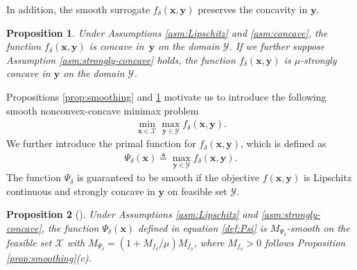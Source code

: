\documentclass[11pt]{article}
\def\vx{\mathbf{x}}
\def\vy{\mathbf{y}}
\def\fX{{\mathcal{X}}}
\def\fY{{\mathcal{Y}}}
\newtheorem{proposition}{Proposition}
\begin{document}
In addition, the smooth surrogate $f_\delta(\vx,\vy)$ preserves  the concavity in $\vy$.
\begin{proposition}\label{prop: concave of f_delta}
Under Assumptions \ref{asm:Lipschitz} and \ref{asm:concave}, the function $f_\delta(\vx,\vy)$ is concave in~$\vy$ on the domain $\fY$.
If we further suppose Assumption \ref{asm:strongly-concave} holds, the function $f_\delta(\vx,\vy)$ is $\mu$-strongly concave in $\vy$ on the domain $\fY$.
\end{proposition}


Propositions \ref{prop:smoothing} and \ref{prop: concave of f_delta} motivate us to introduce the following smooth nonconvex-concave minimax problem
\begin{align}\label{prob:f-delta}
\min_{\vx\in\mathcal{X}}\max_{\vy\in\mathcal{Y}} f_\delta(\vx,\vy).
\end{align}
We further introduce the primal function for $f_\delta(\vx,\vy)$, which is defined as
\begin{align}\label{def:Psi}
 \Psi_\delta(\vx) \triangleq \max_{\vy \in \mathcal{Y}} f_\delta(\vx, \vy). 
\end{align}
The function $\Psi_\delta$ is guaranteed to be smooth if the objective $f(\vx,\vy)$ is Lipschitz continuous and strongly concave in $\vy$ on feasible set $\fY$. 

\begin{proposition}[\citet{lin2020gradient}]\label{prop:smooth-Psi-delta}
Under Assumptions \ref{asm:Lipschitz} and \ref{asm:strongly-concave}, the function $\Psi_\delta(\vx)$ defined in equation \eqref{def:Psi} is $M_{\Psi_\delta}$-smooth on the feasible set $\fX$ with $M_{\Psi_\delta}=(1+M_{f_\delta}/\mu)M_{f_\delta}$,
where $M_{f_\delta}>0$ follows Proposition \ref{prop:smoothing}(c).
\end{proposition}
\end{document}
